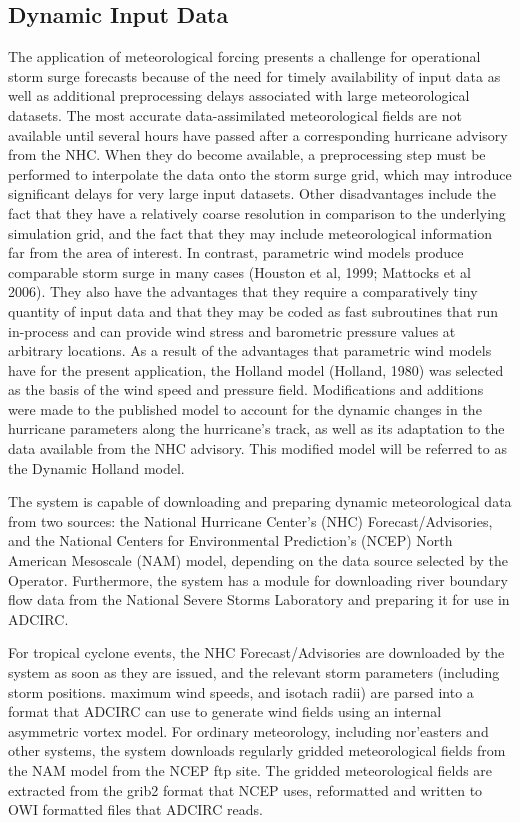 \documentclass[12pt]{article}
\begin{document}
\subsection{Dynamic Input Data}

The application of meteorological forcing presents a challenge for 
operational storm surge forecasts because of the need for timely 
availability of input data as well as additional preprocessing 
delays associated with large meteorological datasets. The most 
accurate data-assimilated meteorological fields are not available 
until several hours have passed after a corresponding hurricane 
advisory from the NHC. When they do become available, a 
preprocessing step must be performed to interpolate the data onto 
the storm surge grid, which may introduce significant delays for 
very large input datasets. Other disadvantages include the fact that 
they have a relatively coarse resolution in comparison to the 
underlying simulation grid, and the fact that they may include 
meteorological information far from the area of interest. In 
contrast, parametric wind models produce comparable storm surge in 
many cases (Houston et al, 1999; Mattocks et al 2006). They also 
have the advantages that they require a comparatively tiny quantity 
of input data and that they may be coded as fast subroutines that 
run in-process and can provide wind stress and barometric pressure 
values at arbitrary locations. As a result of the advantages that 
parametric wind models have for the present application, the Holland 
model (Holland, 1980) was selected as the basis of the wind speed 
and pressure field. Modifications and additions were made to the 
published model to account for the dynamic changes in the hurricane 
parameters along the hurricane’s track, as well as its adaptation to 
the data available from the NHC advisory. This modified model will 
be referred to as the Dynamic Holland model.

The system is capable of downloading and preparing dynamic 
meteorological data from two sources: the National Hurricane 
Center's (NHC) Forecast/Advisories, and the National Centers for 
Environmental Prediction's (NCEP) North American Mesoscale (NAM) 
model, depending on the data source selected by the Operator. 
Furthermore, the system has a module for downloading river boundary 
flow data from the National Severe Storms Laboratory and preparing 
it for use in ADCIRC.

For tropical cyclone events, the NHC Forecast/Advisories are 
downloaded by the system as soon as they are issued, and the 
relevant storm parameters (including storm positions. maximum wind 
speeds, and isotach radii) are parsed into a format that ADCIRC can 
use to generate wind fields using an internal asymmetric vortex 
model. For ordinary meteorology, including nor'easters and other 
systems, the system downloads regularly gridded meteorological 
fields from the NAM model from the NCEP ftp site. The gridded 
meteorological fields are extracted from the grib2 format that NCEP 
uses, reformatted and written to OWI formatted files that ADCIRC 
reads. 
\end{document}
